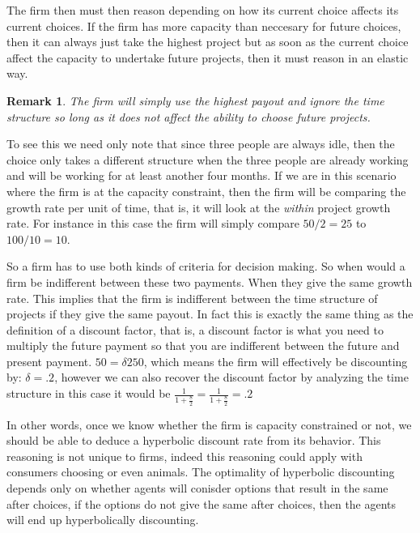 \documentclass[12pt]{report}
\newtheorem{remark}{Remark}
\numberwithin{equation}{section}
\begin{document}
The firm then must then reason depending on how its current choice affects its current choices. If the firm has more capacity than neccesary for future choices, then it can always just take the highest project but as soon as the current choice affect the capacity to undertake future projects, then it must reason in an elastic way. 

\begin{remark}
The firm will simply use the highest payout and ignore the time structure so long as it does not affect the ability to choose future projects. 
\end{remark}

To see this we need only note that since three people are always idle, then the choice only takes a different structure when the three people are already working and will be working for at least another four months. If we are in this scenario where the firm is at the capacity constraint, then the firm will be comparing the growth rate per unit of time, that is, it will look at the \textit{within} project growth rate. For instance in this case the firm will simply compare $50/2=25$ to $100/10=10$. 

So a firm has to use both kinds of criteria for decision making. So when would a firm be indifferent between these two payments. When they give the same growth rate. This implies that the firm is indifferent between the time structure of projects if they give the same payout. In fact this is exactly the same thing as the definition of a discount factor, that is, a discount factor is what you need to multiply the future payment so that you are indifferent between the future and present payment. $50= \delta 250$, which means the firm will effectively be discounting by: $\delta = .2$, however we can also recover the discount factor by analyzing the time structure in this case it would be $\frac{1}{1+\frac{8}{2}}=\frac{1}{1+\frac{8}{2}}=.2$

In other words, once we know whether the firm is capacity constrained or not, we should be able to deduce a hyperbolic discount rate from its behavior. This reasoning is not unique to firms, indeed this reasoning could apply with consumers choosing or even animals. The optimality of hyperbolic discounting depends only on whether agents will conisder options that result in the same after choices, if the options do not give the same after choices, then the agents will end up hyperbolically discounting. 




\end{document}

